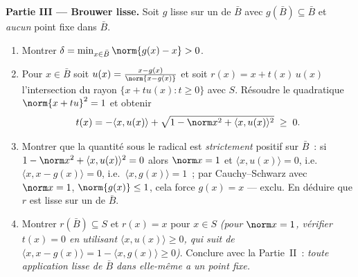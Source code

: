 \begin{problem}
\medskip
\noindent\textbf{Partie III --- Brouwer lisse.} Soit $g$
lisse sur un  de $\bar B$ avec $g(\bar B)
\subseteq \bar B$ et \emph{aucun} point fixe dans $\bar B$.
\begin{enumerate}[resume]
  \item Montrer $\delta = \min_{x\in\bar B}\norm{g(x) - x} >
        0$.
  \item Pour $x \in \bar B$ soit $u(x) = \frac{x -
        g(x)}{\norm{x - g(x)}}$ et soit $r(x) = x +
        t(x)\,u(x)$ l'intersection du rayon $\{x + tu(x) : t
        \geq 0\}$ avec $S$. Résoudre le quadratique
        $\norm{x + tu}^2 = 1$ et obtenir
        \[
        t(x) = -\langle x, u(x)\rangle +
        \sqrt{1 - \norm x^2 + \langle x, u(x)\rangle^2}
        \;\geq\; 0 .
        \]
  \item Montrer que la quantité sous le radical est \emph{strictement}
        positif sur $\bar B$~: si $1 - \norm x^2 + \langle
        x, u(x)\rangle^2 = 0$ alors $\norm x = 1$ et
        $\langle x, u(x)\rangle = 0$, i.e.\ $\langle x, x -
        g(x)\rangle = 0$, i.e.\ $\langle x, g(x)\rangle =
        1$~; par Cauchy--Schwarz avec $\norm x = 1$,
        $\norm{g(x)} \leq 1$, cela force $g(x) = x$ ---
        exclu. En déduire que $r$ est lisse sur un 
        de $\bar B$.
  \item Montrer $r(\bar B) \subseteq S$ et $r(x) = x$ pour
        $x \in S$ \emph{(pour $\norm x = 1$, vérifier $t(x)
        = 0$ en utilisant $\langle x, u(x)\rangle \geq 0$,
        qui suit de $\langle x, x - g(x)\rangle = 1 -
        \langle x, g(x)\rangle \geq 0$)}. Conclure avec la
        Partie~II~: \emph{toute application lisse de $\bar
        B$ dans elle-même a un point fixe.}
\end{enumerate}


\end{problem}
